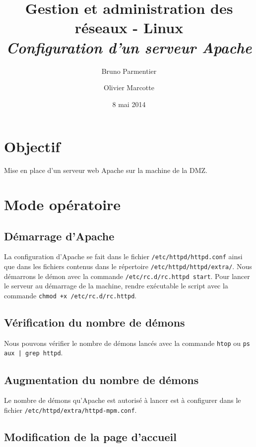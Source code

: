 \documentclass[11pt,a4paper,oneside]{article}
\author{Bruno Parmentier \and Olivier Marcotte}
\title{Gestion et administration des réseaux - Linux \\[1cm] \emph{Configuration
d'un serveur Apache}}
\date{8 mai 2014}
\newcommand{\inlinecode}{\lstinline[breaklines=true]}
\begin{document}
\begin{titlepage}
    \maketitle
    \thispagestyle{empty}
\end{titlepage}

\section{Objectif}
Mise en place d'un serveur web Apache sur la machine de la DMZ.

\section{Mode opératoire}

\subsection{Démarrage d'Apache}

La configuration d'Apache se fait dans le fichier \inlinecode{/etc/httpd/httpd.conf}
ainsi que dans les fichiers contenus dans le répertoire
\inlinecode{/etc/httpd/httpd/extra/}.
Nous démarrons le démon avec la commande \inlinecode{/etc/rc.d/rc.httpd start}. Pour
lancer le serveur au démarrage de la machine, rendre exécutable le script avec
la commande \inlinecode{chmod +x /etc/rc.d/rc.httpd}.

\subsection{Vérification du nombre de démons}

Nous pouvons vérifier le nombre de démons lancés avec la commande \inlinecode{htop} ou
\inlinecode{ps aux | grep httpd}.

\subsection{Augmentation du nombre de démons}

Le nombre de démons qu'Apache est autorisé à lancer est à configurer dans le
fichier \inlinecode{/etc/httpd/extra/httpd-mpm.conf}.

\subsection{Modification de la page d'accueil}
\end{document}
